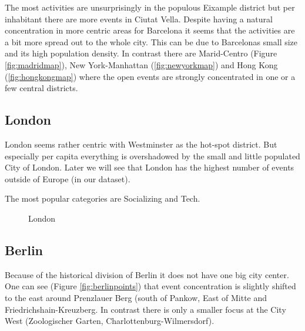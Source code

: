 The most activities are unsurprisingly in the populous Eixample district but per inhabitant there are more events in Ciutat Vella. Despite having a natural concentration in more centric areas for Barcelona it seems that the activities are a bit more spread out to the whole city. This can be due to Barcelonas small size and its high population density. 
In contrast there are Marid-Centro (Figure \ref{fig:madridmap}), New York-Manhattan (\ref{fig:newyorkmap}) and Hong Kong (\ref{fig:hongkongmap}) where the open events are strongly concentrated in one or a few central districts. 

\subsection*{London}

London seems rather centric with Westminster as the hot-spot district. But especially per capita everything is overshadowed by the small and little populated City of London. Later we will see that London has the highest number of events outside of Europe (in our dataset). 

The most popular categories are Socializing and Tech. 

\begin{figure}[!htp]
	\hfill
	\caption{London}
\end{figure}


\subsection*{Berlin}

Because of the historical division of Berlin it does not have one big city center. One can see (Figure \ref{fig:berlinpoints}) that event concentration is slightly shifted to the east around Prenzlauer Berg (south of Pankow, East of Mitte and Friedrichshain-Kreuzberg. In contrast there is only a smaller focus at the City West (Zoologischer Garten, Charlottenburg-Wilmersdorf). 

